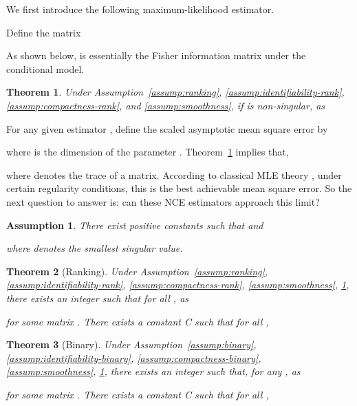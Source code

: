 \documentclass[11pt,a4paper]{article}
\newtheorem{theorem}{Theorem}[section]
\newtheorem{assumption}{Assumption}[section]
\begin{document}
We first introduce the following maximum-likelihood estimator. 

Define the matrix 

As shown below,  is essentially the Fisher information matrix under the conditional model. 
\begin{theorem}
  Under Assumption~\ref{assump:ranking}, \ref{assump:identifiability-rank}, \ref{assump:compactness-rank},  and \ref{assump:smoothness}, if  is non-singular, as 

  \label{thm:mle-mse}
  \vspace{-0.5cm}
\end{theorem}



For any given estimator , define the scaled asymptotic mean square error by 

where  is the dimension of the parameter .
Theorem~\ref{thm:mle-mse} implies that, 

where  denotes the trace of a matrix. According to classical MLE theory \citep{ferguson1996course}, under certain regularity conditions, this is the best achievable mean square error. So the next question to answer is: can these NCE estimators approach this limit? 
\begin{assumption}
There exist positive constants  such that  and

where  denotes the smallest singular value. 
  \label{assump:boundedness}
\end{assumption}


\begin{theorem}[Ranking]
  Under Assumption~\ref{assump:ranking}, \ref{assump:identifiability-rank}, \ref{assump:compactness-rank}, \ref{assump:smoothness}, \ref{assump:boundedness}, there exists an integer  such that for all , as 
  
for some matrix . There exists a constant C such that for all , 

  \label{thm:ranking-mse}
\vspace{-0.4cm}
\end{theorem}



\begin{theorem}[Binary]
Under Assumption~\ref{assump:binary}, \ref{assump:identifiability-binary}, \ref{assump:compactness-binary}, \ref{assump:smoothness}, \ref{assump:boundedness}, there exists an integer  such that, for any , as 
  
for some matrix . There exists a constant C such that for all , 

  \label{thm:binary-mse}
  \vspace{-0.4cm}
\end{theorem}
\end{document}
